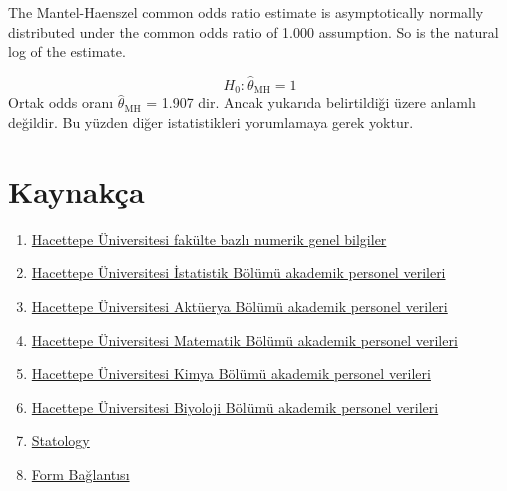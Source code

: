 \documentclass{article}
\begin{document}
The Mantel-Haenszel common odds ratio estimate is asymptotically normally distributed under the common odds ratio of 1.000 assumption. So is the natural log of the estimate.

$$H_0: \hat{\theta}_{\text{MH}} = 1$$
Ortak odds oranı $\hat{\theta}_{\text{MH}}$ = 1.907 dir. Ancak yukarıda belirtildiği üzere anlamlı değildir. Bu yüzden diğer istatistikleri yorumlamaya gerek yoktur.



\clearpage
\section{Kaynakça}
\begin{enumerate}
    \item \href{https://www.hacettepe.edu.tr/ogretim/sayilarla_ogretim}{Hacettepe Üniversitesi fakülte bazlı numerik genel bilgiler}
    \item \href{https://stat.hacettepe.edu.tr/tr/menu/ogretim_uyeleri-118}{Hacettepe Üniversitesi İstatistik Bölümü akademik personel verileri}
    \item \href{https://aktuerya.hacettepe.edu.tr/pers_ou.php}{Hacettepe Üniversitesi Aktüerya Bölümü akademik personel verileri}
    \item \href{https://mat.hacettepe.edu.tr/akademik_personel.html}{Hacettepe Üniversitesi Matematik Bölümü akademik personel verileri}
    \item \href{https://chem.hacettepe.edu.tr/tr/menu/ogretim_uyeleri-10}{Hacettepe Üniversitesi Kimya Bölümü akademik personel verileri}
    \item \href{https://biology.hacettepe.edu.tr/tr/akademik_personel-226}{Hacettepe Üniversitesi Biyoloji Bölümü akademik personel verileri}
    \item \href{https://www.statology.org}{Statology}
    \item \href{https://docs.google.com/forms/d/e/1FAIpQLSf7CBA1tg89lFSdAl9VRSa4vjmv8COCJtRDvQmYa0n0l72JUA/viewform?usp=sf_link}{Form Bağlantısı} \label{form}
\end{enumerate}
\end{document}
